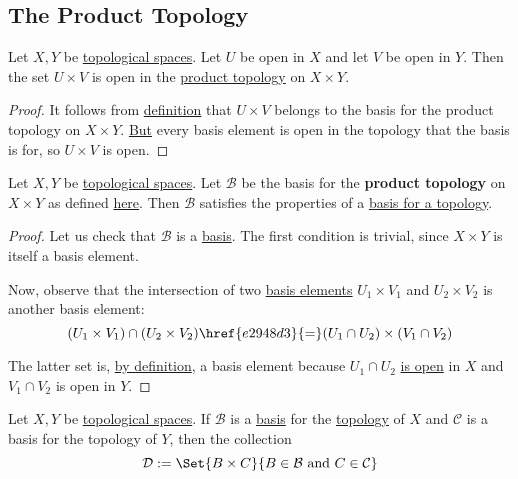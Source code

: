 \subsection{The Product Topology}\label{da72133}

\label{e076386}

Let $X,Y$ be \href{de3c1b1}{topological spaces}. Let $U$ be open in $X$ and let
$V$ be open in $Y$. Then the set $U\times V$ is open in the
\href{be6372e}{product topology} on $X\times Y$.

\begin{proof}
  It follows from \href{be6372e}{definition} that $U\times V$ belongs to the
  basis for the product topology on $X\times Y$. \href{e6b5306}{But} every basis
  element is open in the topology that the basis is for, so $U\times V$ is open.
\end{proof}

\label{ab3a878}

Let $X,Y$ be \href{de3c1b1}{topological spaces}. Let $\mathcal B$ be the basis
for the \textbf{product topology} on $X\times Y$ as defined
\href{be6372e}{here}. Then $\mathcal B$ satisfies the properties of a
\href{e896402}{basis for a topology}.

\begin{proof}
  Let us check that $\mathcal B$ is a \href{e896402}{basis}. The first condition
  is trivial, since $X\times Y$ is itself a basis element.

  Now, observe that the intersection of two \href{e896402}{basis elements}
  $U_1\times V_1$ and $U_2\times V_2$ is another basis element:
  $$
    (U_1\times V_1)\cap(U_2\times V_2)\href{e2948d3}{=}(U_1\cap U_2)\times(V_1\cap V_2)
  $$

  The latter set is, \href{be6372e}{by definition}, a basis element because
  $U_1\cap U_2$ \href{cc8eb8b}{is open} in $X$ and $V_1\cap V_2$ is open in
  $Y$.
\end{proof}

\label{ea7845f}

Let $X,Y$ be \href{de3c1b1}{topological spaces}. If $\mathcal B$ is a
\href{e896402}{basis} for the \href{cc8eb8b}{topology} of $X$ and $\mathcal C$
is a basis for the topology of $Y$, then the collection
$$
  \mathcal D:=\Set{B\times C}{B\in\mathcal B\text{ and }C\in\mathcal C}
$$


